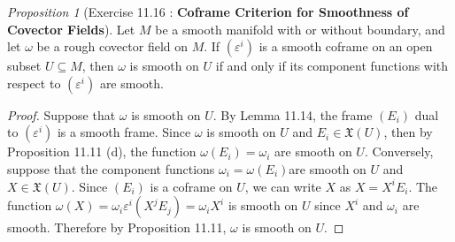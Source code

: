\documentclass[a4paper]{article}
\theoremstyle{remark}
\newtheorem{prop}{Proposition}
\newcommand{\subhim}{\subseteq} %
\newcommand{\VF}{\mathfrak{X}} %
\begin{document}
\begin{prop}[Exercise 11.16 : \textbf{Coframe Criterion for Smoothness of Covector Fields}]
Let $M$ be a smooth manifold with or without boundary, and let $\omega$ be a rough covector field on $M$. If $(\varepsilon^i)$ is a smooth coframe on an open subset $U \subhim M$, then $\omega$ is smooth on $U$ if and only if its component functions with respect to $(\varepsilon^i)$ are smooth. 
\end{prop}
\begin{proof}
Suppose that $\omega $ is smooth on $U$. By Lemma 11.14, the frame $(E_i)$ dual to $(\varepsilon^i)$ is a smooth frame. Since $\omega$ is smooth on $U$ and $E_i \in \VF(U)$, then by Proposition 11.11 (d), the function $\omega(E_i) = \omega_i$ are smooth on $U$. Conversely, suppose that the component functions $\omega_i = \omega(E_i)$are smooth on $U$ and $X \in \VF(U)$. Since $(E_i)$ is a coframe on $U$, we can write $X$ as $X = X^i E_i$. The function $\omega(X) = \omega_i \varepsilon^i (X^j E_j) = \omega_i X^i$ is smooth on $U$ since $X^i$ and $\omega_i$ are smooth. Therefore by Proposition 11.11, $\omega$ is smooth on $U$. 
\end{proof}
\end{document}
